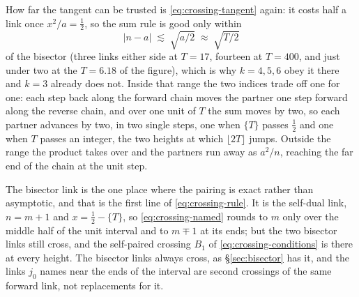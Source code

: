 \documentclass[11pt]{article}
\theoremstyle{definition}
\begin{document}
How far the tangent can be trusted is \eqref{eq:crossing-tangent} again: it
costs half a link once $x^{2}/a=\tfrac12$, so the sum rule is good only within
\begin{equation}\label{eq:crossing-reach}
|n-a|\;\lesssim\;\sqrt{a/2}\;\approx\;\sqrt{T/2}
\end{equation}
of the bisector (three links either side at $T=17$, fourteen at $T=400$, and just
under two at the $T=6.18$ of the figure), which is why $k=4,5,6$ obey it there
and $k=3$ already does not. Inside that range the two indices trade off one for
one: each step back along the forward chain moves the partner one step forward
along the reverse chain, and over one unit of $T$ the sum moves by two, so each
partner advances by two, in two single steps, one when $\{T\}$ passes
$\tfrac12$ and one when $T$ passes an integer, the two heights at which
$\lfloor 2T\rfloor$ jumps. Outside the range the product takes over and the partners run
away as $a^{2}/n$, reaching the far end of the chain at the unit step.

The bisector link is the one place where the pairing is exact rather than
asymptotic, and that is the first line of \eqref{eq:crossing-rule}. It is
the self-dual link, $n=m+1$ and $x=\tfrac12-\{T\}$, so
\eqref{eq:crossing-named} rounds to $m$ only over the middle half of the unit
interval and to $m\mp1$ at its ends; but the two bisector links still cross, and the
self-paired crossing $B_1$ of \eqref{eq:crossing-conditions} is there at every
height. The bisector links always cross, as \S\ref{sec:bisector} has it, and
the links $j_0$ names near the ends of the interval are
second crossings of the same forward link, not replacements for it.
\end{document}
